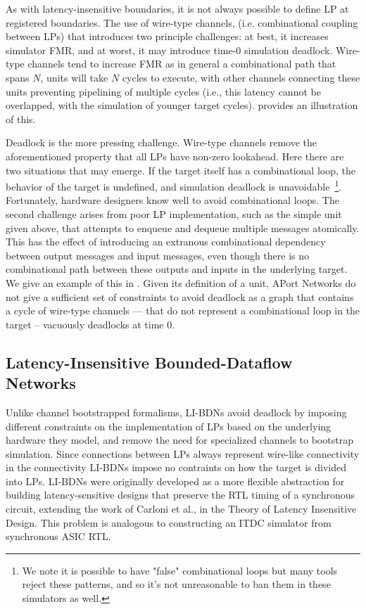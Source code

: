 
As with latency-insensitive boundaries, it is not always possible to define LP
at registered boundaries.  The use of wire-type channels, (i.e. combinational
coupling between LPs) that introduces two principle challenges: at best, it
increases simulator FMR, and at worst, it may introduce time-0 simulation
deadlock.  Wire-type channels tend to increase FMR as in general a
combinational path that spans $N$, units will take $N$ cycles to execute, with
other channels connecting these units preventing pipelining of multiple cycles
(i.e., this latency cannot be overlapped, with the simulation of younger target
cycles).  provides an illustration of this.

Deadlock is the more pressing challenge. Wire-type channels remove the
aforementioned property that all LPs have non-zero lookahead.  Here there are
two situations that may emerge. If the target itself has a combinational loop,
the behavior of the target is undefined, and simulation deadlock is
unavoidable~\footnote{We note it is possible to have "false" combinational
loops but many tools reject these patterns, and so it's not unreasonable to ban
them in these simulators as well.}. Fortunately, hardware designers know well
to avoid combinational loops. The second challenge arises from poor LP
implementation, such as the simple unit given above, that attempts to enqueue
and dequeue multiple messages atomically. This has the effect of introducing an
extranous combinational dependency between output messages and input messages,
even though there is no combinational path between these outputs and inputs in
the underlying target. We give an example of this in . Given its
definition of a unit, APort Networks do not give a sufficient set of
constraints to avoid deadlock as a graph that contains a cycle of wire-type
channels --- that do not represent a combinational loop in the target -- vacuously
deadlocks at time 0.


\subsection{Latency-Insensitive Bounded-Dataflow Networks}

Unlike channel bootstrapped formalisms, LI-BDNs avoid deadlock by imposing
different constraints on the implementation of LPs based on the underlying
hardware they model, and remove the need for specialized channels to bootstrap
simulation. Since connections between LPs always represent wire-like
connectivity in the connectivity LI-BDNs impose no contraints on how the target
is divided into LPs. LI-BDNs were originally developed as a more flexible abstraction for building
latency-sensitive designs that preserve the RTL timing of a synchronous circuit, extending
the work of Carloni et al., in the Theory of Latency Insensitive Design. This problem is analogous
to constructing an ITDC simulator from synchronous ASIC RTL.

